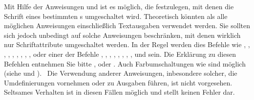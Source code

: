 \begin{Declaration}
\end{Declaration}%
Mit%
 Hilfe der Anweisungen  und  ist es
möglich, die  festzulegen, mit denen die Schrift eines
bestimmten s umgeschaltet wird. Theoretisch könnten als
 alle möglichen Anweisungen einschließlich Textausgaben
verwendet werden.  Sie  sollten sich jedoch unbedingt auf
solche Anweisungen beschränken, mit denen wirklich nur Schriftattribute
umgeschaltet werden. In der Regel werden dies Befehle wie ,
, , , ,
, , , ,
 oder einer der Befehle , ,
, , , ,
, ,  und 
sein. Die Erklärung zu diesen Befehlen entnehmen Sie bitte \cite{l2kurz},
\cite{latex:usrguide-historic} oder \cite{latex:fntguide}. Auch
Farbumschaltungen wie  sind möglich (siehe
\cite{package:graphics} und \cite{package:xcolor}).%
\iffalse %
  \ Das Verhalten bei Verwendung anderer Anweisungen, inbesondere solcher, die
  zu Umdefinierungen führen oder Ausgaben tätigen, ist nicht
  definiert. Seltsames Verhalten ist möglich und stellt keinen Fehler dar.
\else%
  \ Die Verwendung anderer Anweisungen, inbesondere solcher, die
  Umdefinierungen vornehmen oder zu Ausgaben führen, ist nicht vorgesehen.
  Seltsames Verhalten ist in diesen Fällen möglich und stellt keinen Fehler
  dar.%
\fi

